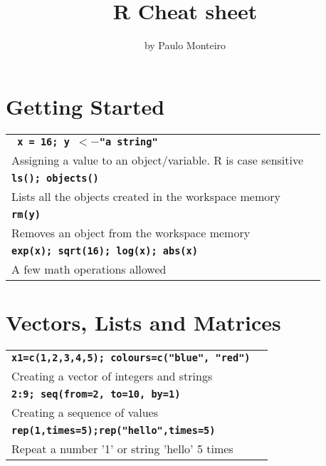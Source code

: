 \documentclass{article}
\title{
  \textbf{R Cheat sheet}
}
\author{by Paulo Monteiro}
\date{}
\begin{document}
  \begin{multicols}{2}
  \maketitle

  \section{\textbf{Getting Started}}
  \begin{tabularx}{\textwidth/2}{X|l}
    \texttt{\textbf{ x = 16; y $<-$"a string"}}\\
    \color{lightgray3}Assigning a value to an object/variable. R is case sensitive\\
    \hline
    
    \texttt{\textbf{ls(); objects()}}\\
    \color{lightgray3}Lists all the objects created in the workspace memory\\
    \hline
    
    \texttt{\textbf{rm(y)}}\\
    \color{lightgray3}Removes an object from the workspace memory\\
    \hline
    
    \texttt{\textbf{exp(x); sqrt(16); log(x); abs(x)}}\\
    \color{lightgray3}A few math operations allowed\\
    \hline
  \end{tabularx}

  \section{\textbf{Vectors, Lists and Matrices}}
  \begin{tabularx}{\textwidth/2}{X|l}
    \texttt{\textbf{x1=c(1,2,3,4,5); colours=c("blue", "red")}}\\
    \color{lightgray3}Creating a vector of integers and strings\\
    \hline
    
    \texttt{\textbf{2:9; seq(from=2, to=10, by=1)}}\\
    \color{lightgray3}Creating a sequence of values\\
    \hline
    
    \texttt{\textbf{rep(1,times=5);rep("hello",times=5)}}\\
    \color{lightgray3}Repeat a number '1' or string 'hello' 5 times\\
    \hline
    

\end{tabularx}
\end{multicols}
\end{document}
